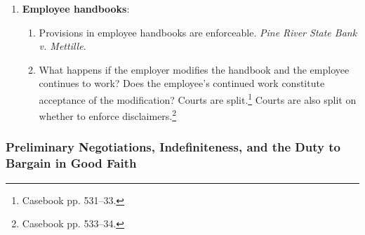 \begin{enumerate}
\begin{enumerate}
        measured by the benefit conferred. Damages in a quantum meruit claim 
        are measured by the reasonable value of the plaintiff's 
        services.\footnote{Casebook pp. 515--16.}
    \end{enumerate}
    \item \textbf{Employee handbooks}:
    \begin{enumerate}
        \item Provisions in employee handbooks are enforceable. \emph{Pine 
        River State Bank v. Mettille}.
        \item What happens if the employer modifies the handbook and the 
        employee continues to work? Does the employee's continued work 
        constitute acceptance of the modification? Courts are 
        split.\footnote{Casebook pp.  531--33.} Courts are also split on 
        whether to enforce disclaimers.\footnote{Casebook pp. 533--34.}
    \end{enumerate}
\end{enumerate}

\subsubsection{Preliminary Negotiations, Indefiniteness, and the Duty to 
Bargain in Good Faith}

